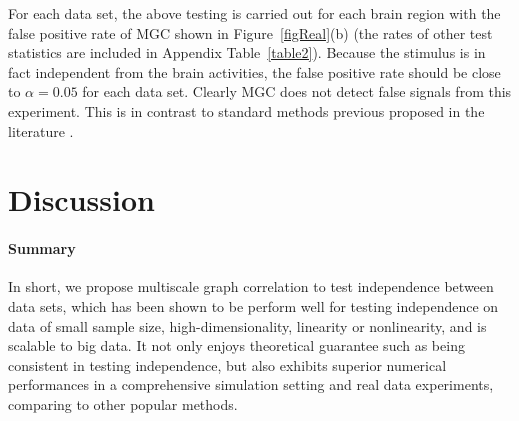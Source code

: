 \documentclass[11pt]{article}
\newcommand{\jv}[1]{{\color{red}{#1}}}
\newcommand{\cs}[1]{{\color{blue}{#1}}}
\begin{document}
For each data set, the above testing is carried out for each brain region with the false positive rate of MGC shown in Figure~\ref{figReal}(b) (the rates of other test statistics are included in Appendix Table~\ref{table2}). Because the stimulus is in fact independent from the brain activities, the false positive rate should be close to $\alpha=0.05$ for each data set. Clearly MGC does not detect false signals from this experiment. This is in contrast to standard methods previous proposed in the literature \cite{EklundKnutsson2012}.
\jv{let's move the table to the appendix, and add just a jittered scatter plot of MGC false positive rate, to include in the other real data figure?}
\cs{done; let me know if you want a better looking scatter plot}
\jv{i do :) can you label the x-axis with the name of the dataset or something? and add a dashed line at p=0.05 for the y-axis.  and make the y scale from 0 to 1 perhaps?}
\cs{Tried again! But if we put all 26 data names on x axis it may look too crowded...we will see}

\section{Discussion}
\label{conclu}

\paragraph{Summary}
In short, we propose multiscale graph correlation to test independence between data sets, which has been shown to be perform well for testing independence on data of small sample size, high-dimensionality, linearity or nonlinearity, and is scalable to big data. It not only enjoys theoretical guarantee such as being consistent in testing independence, but also exhibits superior numerical performances in a comprehensive simulation setting and real data experiments, comparing to other popular methods. 

\end{document}
